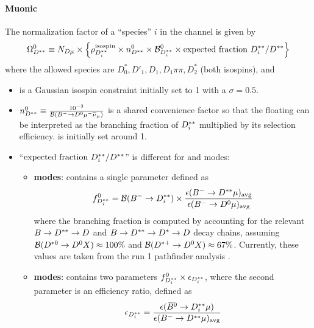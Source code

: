 \paragraph{Muonic}
The normalization factor of a \Dstst ``species'' $i$ in the \Dz channel is given
by
\begin{equation}
    \Omega_{D^{**}}^0 \equiv N_{D\mu} \times \left\{
        \rho_{D^{**}_i}^\text{isospin} \times n^{0}_{D^{**}} \times \mathcal{B}_{D^{**}_i}^{0} \times
        \text{expected fraction $D^{**}_i/D^{**}$}
    \right\}
    \label{eqn:dstst-yield-d0}
\end{equation}
where the allowed species are $D_0^*, D'_1, D_1, D_1\pi\pi, D_2^*$
(both isospins), and
\begin{itemize}
    \item \fitisoDi is a Gaussian isospin constraint initially set to 1
        with a $\sigma = 0.5$.
    \item $n^{0}_{D^{**}} \equiv \frac{10^{-3}}{\mathcal{B}({{{B}^-}} \rightarrow {\ensuremath{{D}^0}}{\ensuremath{\mu^-}}{\ensuremath{{\overline{\nu}}_\mu}})}$
        is a shared convenience factor so that the floating \fitBFDDi can be
        interpreted as the branching fraction of $D^{**}_i$ multiplied by its
        selection efficiency.
        \fitBFDDi is initially set around 1.
    \item ``$\text{expected fraction $D^{**}_i/D^{**}$}$'' is different
        for \Bm and \Bzb modes:

    \begin{itemize}
        \item \textbf{\Bm modes}:
            contains a single parameter \fitfDDi defined as
            \begin{equation}
                f_{D^{**}_i}^{0} = \mathcal{B}({{{B}^-}} \rightarrow D^{**}_i) \times
                \frac{
                    \epsilon({{{B}^-}} \rightarrow D^{**}\mu)_\text{avg}
                }{
                    \epsilon({{{B}^-}} \rightarrow {\ensuremath{{D}^0}}\mu)_\text{avg}
                }
            \end{equation}
            where the branching fraction is computed by accounting for the
            relevant $B \rightarrow D^{**} \rightarrow D$ and
            $B \rightarrow D^{**} \rightarrow {\ensuremath{{D}^*}} \rightarrow D$ decay chains,
            assuming
            $\mathcal{B}({{D}^{*0}} \rightarrow {\ensuremath{{D}^0}} X) \approx 100\%$ and
            $\mathcal{B}({{D}^{*+}} \rightarrow {\ensuremath{{D}^0}} X) \approx 67\%$.
            Currently, these values are taken from the run 1 pathfinder analysis
            \cite{LHCb-ANA-2020-056}.

        \item \textbf{\Bzb modes}:
            contains two parameters $f_{D^{**}_i}^{0} \times \epsilon_{D^{**}_i}$,
            where the second parameter is an efficiency ratio, defined as
            \begin{equation}
                \epsilon_{D^{**}_i} =
                \frac{
                    \epsilon({{\kern 0.18em\overline{\kern -0.18em B}}{}^0} \rightarrow D^{**}_i\mu)
                }{
                    \epsilon({{{B}^-}} \rightarrow D^{**}\mu)_\text{avg}
                }
            \end{equation}
    \end{itemize}
\end{itemize}

